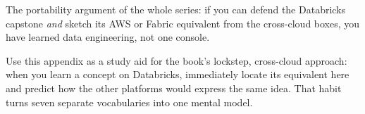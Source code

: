 \noindent The portability argument of the whole series: if you can defend the Databricks
capstone \emph{and} sketch its AWS or Fabric equivalent from the cross-cloud boxes, you have
learned data engineering, not one console.

\begin{tipbox}
Use this appendix as a study aid for the book's lockstep, cross-cloud approach: when
you learn a concept on Databricks, immediately locate its equivalent here and
predict how the other platforms would express the same idea. That habit turns seven
separate vocabularies into one mental model.
\end{tipbox}
